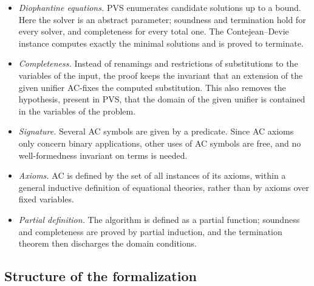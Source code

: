 \documentclass[11pt,a4paper]{article}
\theoremstyle{definition}
\theoremstyle{remark}
\begin{document}
\begin{itemize}[leftmargin=*]
  \item \emph{Diophantine equations.} PVS enumerates candidate solutions up to a bound. Here the
        solver is an abstract parameter; soundness and termination hold for every solver, and
        completeness for every total one. The Contejean--Devie instance computes exactly the
        minimal solutions and is proved to terminate.
  \item \emph{Completeness.} Instead of renamings and restrictions of substitutions to the
        variables of the input, the proof keeps the invariant that an extension of the given
        unifier AC-fixes the computed substitution. This also removes the hypothesis, present in
        PVS, that the domain of the given unifier is contained in the variables of the problem.
  \item \emph{Signature.} Several AC symbols are given by a predicate. Since AC axioms only concern
        binary applications, other uses of AC symbols are free, and no well-formedness invariant
        on terms is needed.
  \item \emph{Axioms.} AC is defined by the set of all instances of its axioms, within a general
        inductive definition of equational theories, rather than by axioms over fixed variables.
  \item \emph{Partial definition.} The algorithm is defined as a partial function; soundness and
        completeness are proved by partial induction, and the termination theorem then
        discharges the domain conditions.
\end{itemize}

\subsection{Structure of the formalization}
\end{document}
